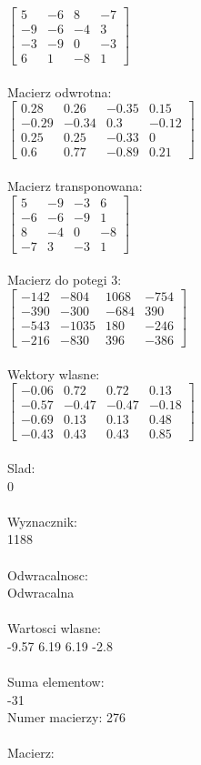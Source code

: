 \documentclass[a4paper,12pt]{article}
\begin{document}
$\begin{bmatrix} 5&-6&8&-7\\-9&-6&-4&3\\-3&-9&0&-3\\6&1&-8&1 \end{bmatrix}$
\\
\\
Macierz odwrotna:\\

$\begin{bmatrix} 0.28&0.26&-0.35&0.15\\-0.29&-0.34&0.3&-0.12\\0.25&0.25&-0.33&0\\0.6&0.77&-0.89&0.21 \end{bmatrix}$
\\
\\
Macierz transponowana:\\

$\begin{bmatrix} 5&-9&-3&6\\-6&-6&-9&1\\8&-4&0&-8\\-7&3&-3&1 \end{bmatrix}$
\\
\\
Macierz do potegi 3:\\

$\begin{bmatrix} -142&-804&1068&-754\\-390&-300&-684&390\\-543&-1035&180&-246\\-216&-830&396&-386 \end{bmatrix}$
\\
\\
Wektory wlasne:\\

$\begin{bmatrix} -0.06&0.72&0.72&0.13\\-0.57&-0.47&-0.47&-0.18\\-0.69&0.13&0.13&0.48\\-0.43&0.43&0.43&0.85 \end{bmatrix}$
\\
\\
Slad:\\
0
\\
\\
Wyznacznik:\\
1188
\\
\\
Odwracalnosc:\\
Odwracalna
\\
\\
Wartosci wlasne:\\
-9.57 6.19 6.19 -2.8
\\
\\
Suma elementow:\\
-31
\\
\newpage
Numer macierzy:
276
\\
\\
Macierz:\\
\end{document}
